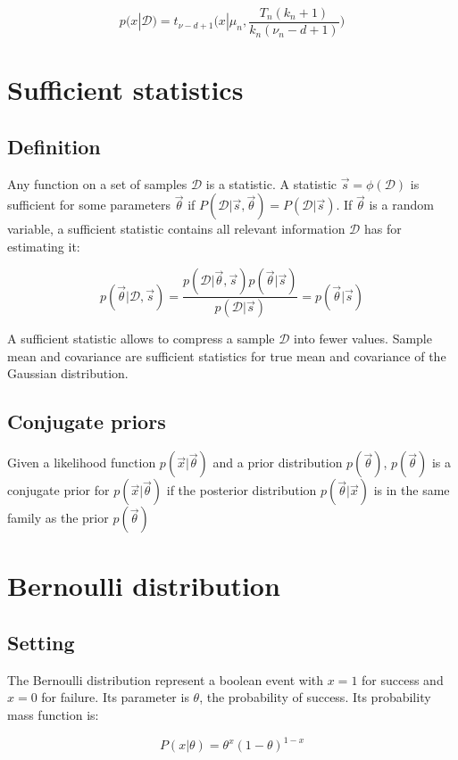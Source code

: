 		$$p(x|\mathcal{D}) = t_{\nu-d+1}\biggl(x|\mu_n, \frac{T_n(k_n+1)}{k_n(\nu_n-d+1)}\biggr)$$

\section{Sufficient statistics}

	\subsection{Definition}
	Any function on a set of samples $\mathcal{D}$ is a statistic.
	A statistic $\vec{s} = \phi(\mathcal{D})$ is sufficient for some parameters $\vec{\theta}$ if $P(\mathcal{D}|\vec{s}, \vec{\theta}) = P(\mathcal{D}|\vec{s})$.
	If $\vec{\theta}$ is a random variable, a sufficient statistic contains all relevant information $\mathcal{D}$ has for estimating it:

	$$p(\vec{\theta}|\mathcal{D}, \vec{s}) = \frac{p(\mathcal{D}|\vec{\theta}, \vec{s})p(\vec{\theta}|\vec{s})}{p(\mathcal{D}|\vec{s})} = p(\vec{\theta}|\vec{s})$$

	A sufficient statistic allows to compress a sample $\mathcal{D}$ into fewer values.
	Sample mean and covariance are sufficient statistics for true mean and covariance of the Gaussian distribution.

	\subsection{Conjugate priors}
	Given a likelihood function $p(\vec{x}|\vec{\theta})$ and a prior distribution $p(\vec{\theta})$, $p(\vec{\theta})$ is a conjugate prior for $p(\vec{x}|\vec{\theta})$ if the posterior distribution $p(\vec{\theta}|\vec{x})$ is in the same family as the prior $p(\vec{\theta})$

\section{Bernoulli distribution}

	\subsection{Setting}
	The Bernoulli distribution represent a boolean event with $x=1$ for success and $x=0$ for failure.
	Its parameter is $\theta$, the probability of success.
	Its probability mass function is:

	$$P(x|\theta) = \theta^x(1-\theta)^{1-x}$$

